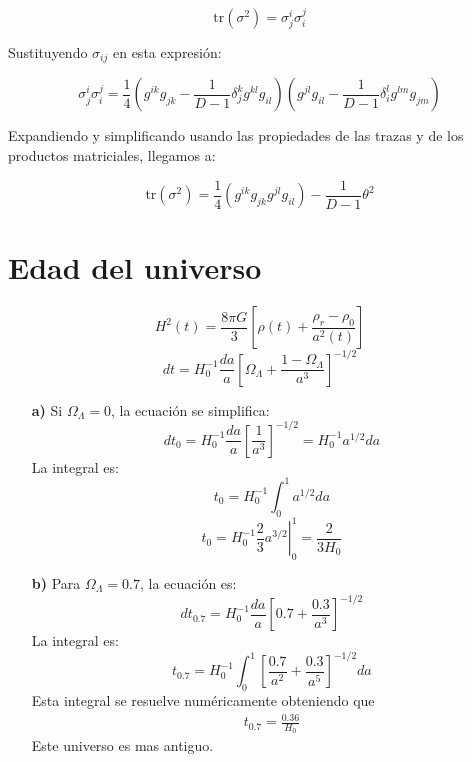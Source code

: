 \documentclass{article}
\begin{document}
\begin{itemize}
    \[
    \text{tr}(\sigma^2) = \sigma_j^i \sigma_i^j
    \]

    Sustituyendo \( \sigma_{ij} \) en esta expresión:

    \[
    \sigma_j^i \sigma_i^j = \frac{1}{4} \left( g^{ik} g_{jk} - \frac{1}{D-1} \delta_j^k g^{kl} g_{il} \right) \left( g^{jl} g_{il} - \frac{1}{D-1} \delta_i^l g^{lm} g_{jm} \right)
    \]

    Expandiendo y simplificando usando las propiedades de las trazas y de los productos matriciales, llegamos a:

    \[
    \text{tr}(\sigma^2) = \frac{1}{4} \left( g^{ik} g_{jk} g^{jl} g_{il} \right) - \frac{1}{D-1} \theta^2
    \]
\end{itemize}








\section{Edad del universo }

\[
H^2(t) = \frac{8\pi G}{3} \left[ \rho(t) + \frac{\rho_r - \rho_0}{a^2(t)} \right]
\]
\[
dt = H_0^{-1} \frac{da}{a} \left[ \Omega_\Lambda + \frac{1 - \Omega_\Lambda}{a^3} \right]^{-1/2}
\]
\begin{enumerate}
  \item[\textbf{a)}] 
    Si \(\Omega_\Lambda = 0\), la ecuación se simplifica:
    \[
    dt_0 = H_0^{-1} \frac{da}{a} \left[ \frac{1}{a^3} \right]^{-1/2} = H_0^{-1} a ^ {1/2} da
  \]
    La integral es:
    \[
    t _{0}  = H_0^{-1} \int_0^1 a^{1/2} da
    \]
    \[
    t _{0}  = \left. H_0^{-1} \frac{2}{3} a ^ {3/2 } \right| _{0}^1 = \frac{2}{3 H_0} 
  \]

  \item[\textbf{b)}] 
    Para \(\Omega_\Lambda = 0.7\), la ecuación es:
    \[
    dt _{0.7}= H_0^{-1} \frac{da}{a} \left[ 0.7 + \frac{0.3}{a^3} \right]^{-1/2}
    \]
    La integral es:
    \[
      t_{0.7} = H_0^{-1} \int_0^1 \left[ \frac{0.7 }{a^2 } + \frac{0.3 }{a^5} \right]^{-1/2} da
    \]
    Esta integral se resuelve numéricamente obteniendo que 
    \begin{gather*}
      t _{0.7 }  = \frac{0.36}{H_0} 
    \end{gather*}
    Este universo es mas antiguo.

\end{enumerate}
\end{document}
